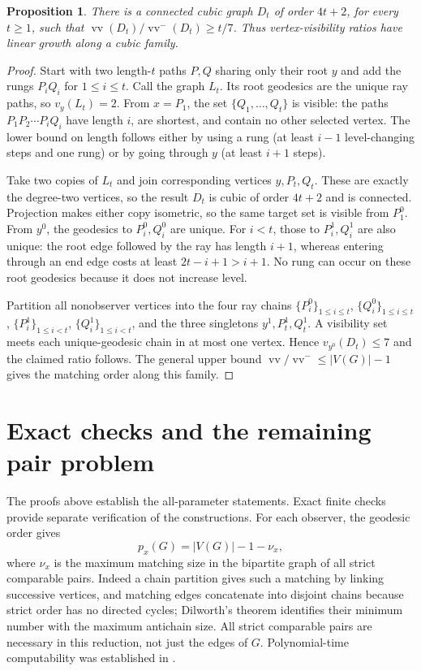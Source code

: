 \documentclass[11pt]{article}
\newtheorem{proposition}[theorem]{Proposition}
\theoremstyle{remark}\newtheorem{remark}[theorem]{Remark}
\newcommand{\vv}{\operatorname{vv}}
\newcommand{\vvm}{\operatorname{vv}^{-}}
\begin{document}
\begin{proposition}\label{prop:visibility}
There is a connected cubic graph $D_t$ of order $4t+2$, for every $t\ge1$,
such that $\vv(D_t)/\vvm(D_t)\ge t/7$. Thus vertex-visibility ratios have
linear growth along a cubic family.
\end{proposition}
\begin{proof}
Start with two length-$t$ paths $P,Q$ sharing only their root $y$ and add
the rungs $P_iQ_i$ for $1\le i\le t$. Call the graph $L_t$.
Its root geodesics are the unique ray paths, so $v_y(L_t)=2$.
From $x=P_1$, the set $\{Q_1,\ldots,Q_t\}$ is visible: the paths
$P_1P_2\cdots P_iQ_i$ have length $i$, are shortest, and contain no other
selected vertex. The lower bound on length follows either by using a rung
(at least $i-1$ level-changing steps and one rung) or by going through $y$
(at least $i+1$ steps).

Take two copies of $L_t$ and join corresponding vertices $y,P_t,Q_t$.
These are exactly the degree-two vertices, so the result $D_t$ is cubic
of order $4t+2$ and is connected. Projection makes either copy isometric,
so the same target set is visible from $P_1^0$. From $y^0$, the geodesics
to $P_i^0,Q_i^0$ are unique. For $i<t$, those to $P_i^1,Q_i^1$ are also
unique: the root edge followed by the ray has length $i+1$, whereas entering
through an end edge costs at least $2t-i+1>i+1$. No rung can occur on these
root geodesics because it does not increase level.

Partition all nonobserver vertices into the four ray chains
$\{P_i^0\}_{1\le i\le t}$, $\{Q_i^0\}_{1\le i\le t}$,
$\{P_i^1\}_{1\le i<t}$, $\{Q_i^1\}_{1\le i<t}$, and the three singletons
$y^1,P_t^1,Q_t^1$. A visibility set meets each unique-geodesic chain in at
most one vertex. Hence $v_{y^0}(D_t)\le7$ and the claimed ratio follows.
The general upper bound $\vv/\vvm\le |V(G)|-1$ gives the matching order
along this family.
\end{proof}

\section{Exact checks and the remaining pair problem}
The proofs above establish the all-parameter statements. Exact finite checks
provide separate verification of the constructions. For each observer, the
geodesic order gives
\[
 p_x(G)=|V(G)|-1-\nu_x,
\]
where $\nu_x$ is the maximum matching size in the bipartite graph of all
strict comparable pairs. Indeed a chain partition gives such a matching by
linking successive vertices, and matching edges concatenate into disjoint
chains because strict order has no directed cycles; Dilworth's theorem
identifies their minimum number with the maximum antichain size.
All strict comparable pairs are necessary in this reduction, not just the
edges of $G$. Polynomial-time computability was established in
\cite[Theorem 5.7 and Corollary 5.8]{position}.
\end{document}
